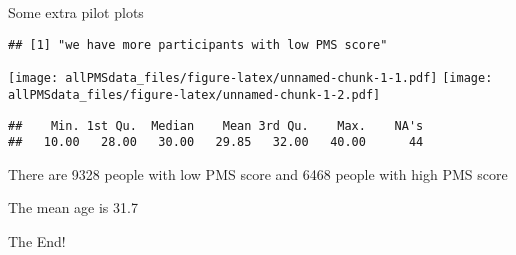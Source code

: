 \documentclass[
]{article}
\begin{document}
Some extra pilot plots

\begin{verbatim}
## [1] "we have more participants with low PMS score"
\end{verbatim}

\texttt{[image: allPMSdata\_files/figure-latex/unnamed-chunk-1-1.pdf]}
\texttt{[image: allPMSdata\_files/figure-latex/unnamed-chunk-1-2.pdf]}

\begin{verbatim}
##    Min. 1st Qu.  Median    Mean 3rd Qu.    Max.    NA's 
##   10.00   28.00   30.00   29.85   32.00   40.00      44
\end{verbatim}

There are 9328 people with low PMS score and 6468 people with high PMS
score

The mean age is 31.7

The End!
\end{document}
